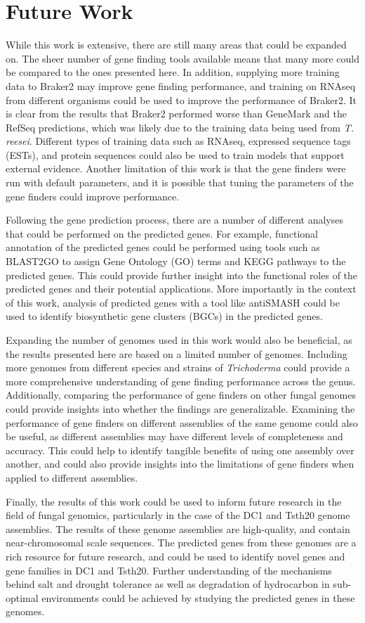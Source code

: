 \section{Future Work}

While this work is extensive, there are still many areas that could be expanded on. The sheer number of gene finding tools available means that many more could be compared to the ones presented here. In addition, supplying more training data to Braker2 may improve gene finding performance, and training on RNAseq from different organisms could be used to improve the performance of Braker2. It is clear from the results that Braker2 performed worse than GeneMark and the RefSeq predictions, which was likely due to the training data being used from \textit{T. reesei}. Different types of training data such as RNAseq, expressed sequence tags (ESTs), and protein sequences could also be used to train models that support external evidence. Another limitation of this work is that the gene finders were run with default parameters, and it is possible that tuning the parameters of the gene finders could improve performance.

Following the gene prediction process, there are a number of different analyses that could be performed on the predicted genes. For example, functional annotation of the predicted genes could be performed using tools such as BLAST2GO to assign Gene Ontology (GO) terms and KEGG pathways to the predicted genes. This could provide further insight into the functional roles of the predicted genes and their potential applications. More importantly in the context of this work, analysis of predicted genes with a tool like antiSMASH could be used to identify biosynthetic gene clusters (BGCs) in the predicted genes. 

Expanding the number of genomes used in this work would also be beneficial, as the results presented here are based on a limited number of genomes. Including more genomes from different species and strains of \textit{Trichoderma} could provide a more comprehensive understanding of gene finding performance across the genus. Additionally, comparing the performance of gene finders on other fungal genomes could provide insights into whether the findings are generalizable. Examining the performance of gene finders on different assemblies of the same genome could also be useful, as different assemblies may have different levels of completeness and accuracy. This could help to identify tangible benefits of using one assembly over another, and could also provide insights into the limitations of gene finders when applied to different assemblies.

Finally, the results of this work could be used to inform future research in the field of fungal genomics, particularly in the case of the DC1 and Tsth20 genome assemblies. The results of these genome assemblies are high-quality, and contain near-chromosomal scale sequences. The predicted genes from these genomes are a rich resource for future research, and could be used to identify novel genes and gene families in DC1 and Tsth20. Further understanding of the mechanisms behind salt and drought tolerance as well as degradation of hydrocarbon in sub-optimal environments could be achieved by studying the predicted genes in these genomes. 
